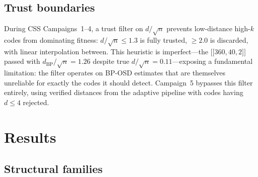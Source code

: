 \documentclass[aps,prxquantum,twocolumn,superscriptaddress,nofootinbib]{revtex4-2}
\newcommand{\dblbrk}[1]{\ensuremath{\lbrack\!\lbrack #1 \rbrack\!\rbrack}}
\newcommand{\code}[1]{\dblbrk{#1}}
\begin{document}
\subsection{Trust boundaries}
\label{sec:trust}

During CSS Campaigns~1--4, a trust filter on $d/\sqrt{n}$ prevents low-distance high-$k$ codes from dominating fitness: $d/\sqrt{n} \leq 1.3$ is fully trusted, $\geq 2.0$ is discarded, with linear interpolation between.
This heuristic is imperfect---the $\code{360,40,2}$ passed with $d_{\text{BP}}/\sqrt{n} = 1.26$ despite true $d/\sqrt{n} = 0.11$---exposing a fundamental limitation: the filter operates on BP-OSD estimates that are themselves unreliable for exactly the codes it should detect.
Campaign~5 bypasses this filter entirely, using verified distances from the adaptive pipeline with codes having $d \leq 4$ rejected.

\section{Results}
\label{sec:results}

\subsection{Structural families}
\label{sec:families}
\end{document}
